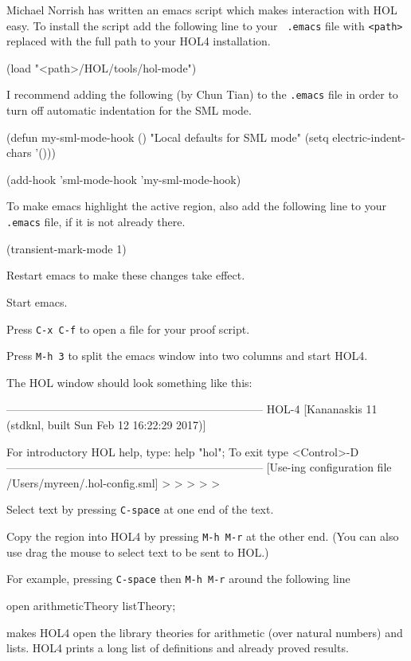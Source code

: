 \documentclass[a4paper,10pt]{article}
\begin{document}

Michael Norrish has written an emacs script which makes interaction
with HOL easy. To install the script add the following line to your {\tt
.emacs} file with {\tt <path>} replaced with the full path to your HOL4
installation.
\begin{code}
(load "<path>/HOL/tools/hol-mode")
\end{code}
I recommend adding the following (by Chun Tian) to the {\tt .emacs} file
in order to turn off automatic indentation for the SML mode.
\begin{code}
(defun my-sml-mode-hook ()
  "Local defaults for SML mode"
  (setq electric-indent-chars '()))

(add-hook 'sml-mode-hook 'my-sml-mode-hook)
\end{code}
To make emacs highlight the active region, also add the following line
to your {\tt .emacs} file, if it is not already there.
\begin{code}
(transient-mark-mode 1)
\end{code}
Restart emacs to make these changes take effect.


\begin{enum}
\item Start emacs.
\item Press {\tt C-x C-f} to open a file for your proof script.
\item Press {\tt M-h 3} to split the emacs window into two columns and start HOL4.
\end{enum}
The HOL window should look something like this:
\begin{code}
---------------------------------------------------------------------
       HOL-4 [Kananaskis 11 (stdknl, built Sun Feb 12 16:22:29 2017)]

       For introductory HOL help, type: help "hol";
       To exit type <Control>-D
---------------------------------------------------------------------
[Use-ing configuration file /Users/myreen/.hol-config.sml]
> > > > >
\end{code}


\begin{enum}
\item Select text by pressing {\tt C-space} at one end of the text.
\item Copy the region into HOL4 by pressing {\tt M-h M-r} at the other
  end. (You can also use drag the mouse to select text to be sent to
  HOL.)
\end{enum}
For example, pressing {\tt C-space} then {\tt M-h M-r} around the following line
\begin{code}
open arithmeticTheory listTheory;
\end{code}
makes HOL4 open the library theories for arithmetic (over natural numbers)
and lists. HOL4 prints a long list of definitions and already proved results.
\end{document}
